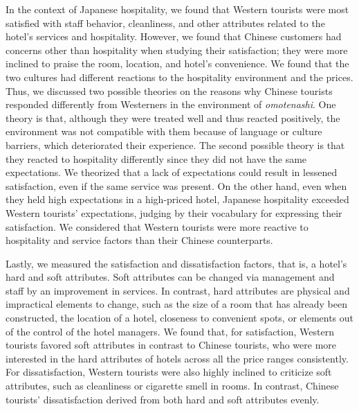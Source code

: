 \documentclass[smallextended,natbib]{svjour3}       %
\begin{document}
  In the context of Japanese hospitality, we found that Western tourists were most satisfied with staff behavior, cleanliness, and other attributes related to the hotel's services and hospitality. However, we found that Chinese customers had concerns other than hospitality when studying their satisfaction; they were more inclined to praise the room, location, and hotel's convenience. We found that the two cultures had different reactions to the hospitality environment and the prices. Thus, we discussed two possible theories on the reasons why Chinese tourists responded differently from Westerners in the environment of \textit{omotenashi}. One theory is that, although they were treated well and thus reacted positively, the environment was not compatible with them because of language or culture barriers, which deteriorated their experience. The second possible theory is that they reacted to hospitality differently since they did not have the same expectations. We theorized that a lack of expectations could result in lessened satisfaction, even if the same service was present. On the other hand, even when they held high expectations in a high-priced hotel, Japanese hospitality exceeded Western tourists’ expectations, judging by their vocabulary for expressing their satisfaction. We considered that Western tourists were more reactive to hospitality and service factors than their Chinese counterparts.

  Lastly, we measured the satisfaction and dissatisfaction factors, that is, a hotel's hard and soft attributes. Soft attributes can be changed via management and staff by an improvement in services. In contrast, hard attributes are physical and impractical elements to change, such as the size of a room that has already been constructed, the location of a hotel, closeness to convenient spots, or elements out of the control of the hotel managers. We found that, for satisfaction, Western tourists favored soft attributes in contrast to Chinese tourists, who were more interested in the hard attributes of hotels across all the price ranges consistently. For dissatisfaction, Western tourists were also highly inclined to criticize soft attributes, such as cleanliness or cigarette smell in rooms. In contrast, Chinese tourists' dissatisfaction derived from both hard and soft attributes evenly.
\end{document}
